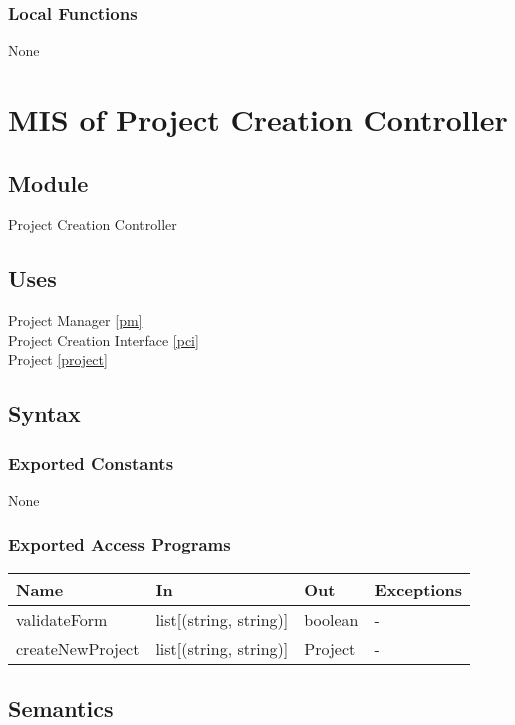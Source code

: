 \documentclass[12pt, titlepage]{article}
\begin{document}
\subsubsection{Local Functions}
None

\section{MIS of Project Creation Controller} \label{pcc}

\subsection{Module}

Project Creation Controller

\subsection{Uses}

Project Manager \ref{pm}\\
Project Creation Interface \ref{pci}\\
Project \ref{project} \\

\subsection{Syntax}

\subsubsection{Exported Constants}
None
\subsubsection{Exported Access Programs}

\begin{center}
\begin{tabular}{p{4cm} p{4cm} p{4cm} p{2cm}}
\hline
\textbf{Name} & \textbf{In} & \textbf{Out} & \textbf{Exceptions} \\
\hline
validateForm & list[(string, string)] & boolean & - \\
createNewProject & list[(string, string)] & Project & - \\
\hline
\end{tabular}
\end{center}

\subsection{Semantics}
\end{document}
